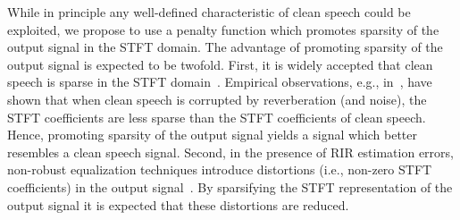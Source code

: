 \documentclass{article}
\begin{document}
While in principle any well-defined characteristic of clean speech could be exploited, we propose to use a penalty function which promotes sparsity of the output signal in the STFT domain.
The advantage of promoting sparsity of the output signal is expected to be twofold.
First, it is widely accepted that clean speech is sparse in the STFT domain~\cite{makino_2010,Tashev_IWAENC_2010,Gerkmann_IWAENC_2010}. 
Empirical observations, e.g., in~\cite{makino_2010}, have shown that when clean speech is corrupted by reverberation (and noise), the STFT coefficients are less sparse than the STFT coefficients of clean speech.
Hence, promoting sparsity of the output signal yields a signal which better resembles a clean speech signal.
Second, in the presence of RIR estimation errors, non-robust equalization techniques introduce distortions (i.e., non-zero STFT coefficients) in the output signal~\cite{Kodrasi_ITASLP_2013}.
By sparsifying the STFT representation of the output signal it is expected that these distortions are reduced.
\end{document}
